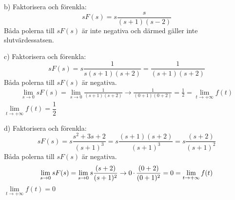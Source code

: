 \begin{task}{b)}
	Faktorisera och förenkla:
	\[sF(s)=
	s\frac{s}{(s+1)(s-2)}\]
	Båda polerna till $sF(s)$ är inte negativa och därmed gäller inte slutvärdessatsen.
\end{task}

\begin{task}{c)}
	Faktorisera och förenkla:
	\[sF(s)=
	s\frac{1}{s(s+1)(s+2)}=
	\frac{1}{(s+1)(s+2)}\]
	Båda polerna till $sF(s)$ är negativa.
	\begin{align*}
	\lim\limits_{s\rightarrow 0}sF(s)=
	\lim\limits_{s\rightarrow 0}\frac{1}{(s+1)(s+2)}\rightarrow
	\frac{1}{(0+1)(0+2)}=
	\frac{1}{2}=\lim\limits_{t\rightarrow +\infty}f(t)
	\end{align*}
	\ans $\lim\limits_{t\rightarrow +\infty}f(t)=\dfrac{1}{2}$
\end{task}

\begin{task}{d)}
	Faktorisera och förenkla:
	\[sF(s)=
	s\frac{s^2+3s+2}{(s+1)^3}=
	s\frac{(s+1)(s+2)}{(s+1)^3}=
	s\frac{(s+2)}{(s+1)^2}\]
	Båda polerna till $sF(s)$ är negativa.
	\begin{align*}
	\lim\limits_{s\rightarrow 0}sF(s)=
	\lim\limits_{s\rightarrow 0}s\frac{(s+2)}{(s+1)^2}\rightarrow
	0\operatorname{\cdot}\frac{(0+2)}{(0+1)^2}=
	0=\lim\limits_{t\rightarrow +\infty}f(t)
	\end{align*}
	\ans $\lim\limits_{t\rightarrow +\infty}f(t)=0$
\end{task}